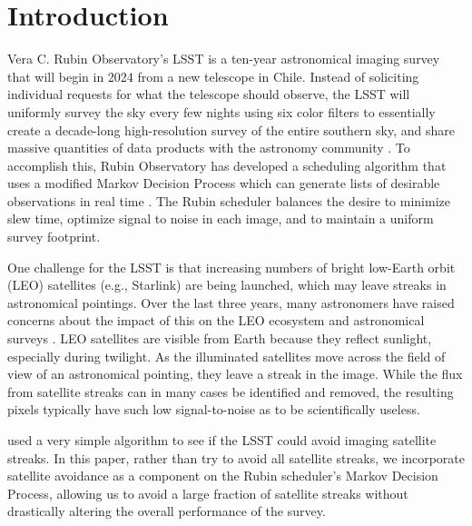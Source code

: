 \documentclass[linenumbers]{aastex631}
\begin{document}
\section{Introduction} \label{sec:intro}

Vera C. Rubin Observatory's LSST is a ten-year astronomical imaging survey that will begin in 2024 from a new telescope in Chile. Instead of soliciting individual requests for what the telescope should observe, the LSST will uniformly survey the sky every few nights using six color filters to essentially create a decade-long high-resolution survey of the entire southern sky, and share massive quantities of data products with the astronomy community \citep{overview}. To accomplish this, Rubin Observatory has developed a scheduling algorithm that uses a modified Markov Decision Process which can generate lists of desirable observations in real time \citep{naghib19}. The Rubin scheduler balances the desire to minimize slew time, optimize signal to noise in each image, and to maintain a uniform survey footprint.

One challenge for the LSST is that increasing numbers of bright low-Earth orbit (LEO) satellites (e.g., Starlink) are being launched, which may leave streaks in astronomical pointings. Over the last three years, many astronomers have raised concerns about the impact of this on the LEO ecosystem and astronomical surveys \citep{lawrence22,tyson20}. LEO satellites are visible from Earth because they reflect sunlight, especially during twilight. As the illuminated satellites move across the field of view of an astronomical pointing, they leave a streak in the image. While the flux from satellite streaks can in many cases be identified and removed, the resulting pixels typically have such low signal-to-noise as to be scientifically useless.

\citet{tyson20} used a very simple algorithm to see if the LSST could avoid imaging satellite streaks. In this paper, rather than try to avoid all satellite streaks, we incorporate satellite avoidance as a component on the Rubin scheduler's Markov Decision Process, allowing us to avoid a large fraction of satellite streaks without drastically altering the overall performance of the survey.
\end{document}
